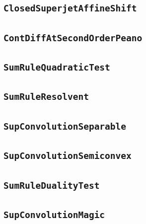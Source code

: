 \documentclass[11pt]{amsart}
\theoremstyle{definition}
\begin{document}
\subsection{\texorpdfstring{\texttt{ClosedSuperjetAffineShift}}{ClosedSuperjetAffineShift}}\label{node:ClosedSuperjetAffineShift}


\subsection{\texorpdfstring{\texttt{ContDiffAtSecondOrderPeano}}{ContDiffAtSecondOrderPeano}}\label{node:ContDiffAtSecondOrderPeano}


\subsection{\texorpdfstring{\texttt{SumRuleQuadraticTest}}{SumRuleQuadraticTest}}\label{node:SumRuleQuadraticTest}


\subsection{\texorpdfstring{\texttt{SumRuleResolvent}}{SumRuleResolvent}}\label{node:SumRuleResolvent}


\subsection{\texorpdfstring{\texttt{SupConvolutionSeparable}}{SupConvolutionSeparable}}\label{node:SupConvolutionSeparable}


\subsection{\texorpdfstring{\texttt{SupConvolutionSemiconvex}}{SupConvolutionSemiconvex}}\label{node:SupConvolutionSemiconvex}


\subsection{\texorpdfstring{\texttt{SumRuleDualityTest}}{SumRuleDualityTest}}\label{node:SumRuleDualityTest}


\subsection{\texorpdfstring{\texttt{SupConvolutionMagic}}{SupConvolutionMagic}}\label{node:SupConvolutionMagic}

\end{document}
